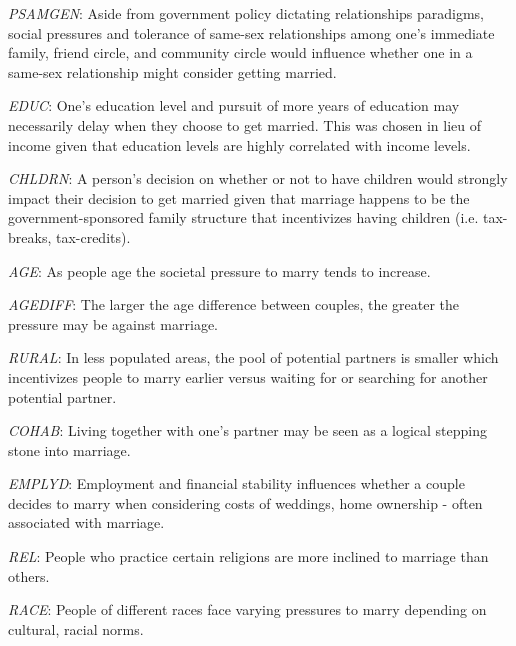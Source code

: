 \documentclass[letterpaper,12pt]{article}
\theoremstyle{definition}
\begin{document}
\textit{PSAMGEN}: Aside from government policy dictating relationships paradigms, social pressures and tolerance of same-sex relationships among one's immediate family, friend circle, and community circle would influence whether one in a same-sex relationship might consider getting married.

\textit{EDUC}: One's education level and pursuit of more years of education may necessarily delay when they choose to get married. This was chosen in lieu of income given that education levels are highly correlated with income levels. 

\textit{CHLDRN}: A person's decision on whether or not to have children would strongly impact their decision to get married given that marriage happens to be the government-sponsored family structure that incentivizes having children (i.e. tax-breaks, tax-credits). 

\textit{AGE}: As people age the societal pressure to marry tends to increase.

\textit{AGEDIFF}: The larger the age difference between couples, the greater the pressure may be against marriage.

\textit{RURAL}: In less populated areas, the pool of potential partners is smaller which incentivizes people to marry earlier versus waiting for or searching for another potential partner.

\textit{COHAB}: Living together with one's partner may be seen as a logical stepping stone into marriage.

\textit{EMPLYD}: Employment and financial stability influences whether a couple decides to marry when considering costs of weddings, home ownership - often associated with marriage.

\textit{REL}: People who practice certain religions are more inclined to marriage than others.

\textit{RACE}: People of different races face varying pressures to marry depending on cultural, racial norms. 

\vspace{2mm}
\end{document}
